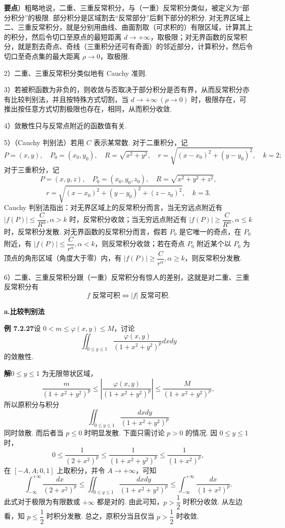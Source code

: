 \documentclass[UTF8,12pt,a4paper,fontset=fandol]{ctexart}
\begin{document}
\noindent\textbf{要点}）粗略地说，二重、三重反常积分，与（一重）反常积分类似，被定义为“部分积分”的极限. 部分积分是区域割去“反常部分”后剩下部分的积分. 对无界区域上二、三重反常积分，就是分别用曲线、曲面割取（可求积的）有限区域，计算其上的积分，然后令切口至原点的最短距离 $d\to+\infty$，取极限；对无界函数的反常积分，就是割去奇点、奇线（三重积分还可有奇面）的邻近部分，计算积分，然后令切口至奇点集的最大距离 $\rho\to0$，取极限.

2）二重、三重反常积分类似地有 Cauchy 准则.

3）若被积函数为非负的，则收敛与否取决于部分积分是否有界，从而反常积分亦有比较判别法，并且按特殊方式切割，当 $d\to+\infty\ (\rho\to0)$ 时，极限存在，可推出按任意方式切割极限也存在，相同，从而积分收敛.

4）敛散性只与反常点附近的函数值有关.

5）（Cauchy 判别法）若用 $C$ 表示某常数. 对于二重积分，记
\[
P=(x,y),\quad P_0=(x_0,y_0),\quad R=\sqrt{x^2+y^2},\quad
r=\sqrt{(x-x_0)^2+(y-y_0)^2},\quad k=2;
\]
对于三重积分，记
\[
P=(x,y,z),\quad P_0=(x_0,y_0,z_0),\quad R=\sqrt{x^2+y^2+z^2},
\]
\[
r=\sqrt{(x-x_0)^2+(y-y_0)^2+(z-z_0)^2},\quad k=3.
\]
Cauchy 判别法指出：对无界区域上的反常积分而言，当无穷远点附近有 $|f(P)|\le\dfrac C{R^\alpha},\alpha>k$ 时，反常积分收敛；当无穷远点附近有 $|f(P)|\ge\dfrac C{R^\alpha},\alpha\le k$ 时，反常积分发散. 对无界函数的反常积分而言，假若 $P_0$ 是它唯一的奇点，在 $P_0$ 附近，有 $|f(P)|\le\dfrac C{r^\alpha},\alpha<k$，则反常积分收敛；若在奇点 $P_0$ 附近某个以 $P_0$ 为顶点的角形区域（角度大于零）内，有 $|f(P)|\ge\dfrac C{r^\alpha},\alpha\ge k$，则反常积分发散.

6）二重、三重反常积分跟（一重）反常积分有惊人的差别，这就是对二重、三重反常积分有
\[
f\text{ 反常可积}\Longleftrightarrow |f|\text{ 反常可积}.
\]

\noindent\textbf{a.\quad 比较判别法}

\noindent\textbf{例 7.2.27}\quad 设 $0<m\le\varphi(x,y)\le M$，讨论
\[
\iint_{0\le y\le1}\frac{\varphi(x,y)}{(1+x^2+y^2)^p}dxdy
\]
的敛散性.

\noindent\textbf{解}\quad $0\le y\le1$ 为无限带状区域，
\[
\frac m{(1+x^2+y^2)^p}\le
\left|\frac{\varphi(x,y)}{(1+x^2+y^2)^p}\right|
\le\frac M{(1+x^2+y^2)^p},
\]
所以原积分与积分
\[
\iint_{0\le y\le1}\frac{dxdy}{(1+x^2+y^2)^p}
\]
同时敛散. 而后者当 $p\le0$ 时明显发散. 下面只需讨论 $p>0$ 的情况. 因 $0\le y\le1$ 时，
\[
0\le\frac1{(2+x^2)^p}\le\frac1{(1+x^2+y^2)^p}\le\frac1{(1+x^2)^p},
\]
在 $[-A,A;0,1]$ 上取积分，并令 $A\to+\infty$，可知
\[
\int_{-\infty}^{+\infty}\frac{dx}{(2+x^2)^p}
\le\iint_{0\le y\le1}\frac{dxdy}{(1+x^2+y^2)^p}
\le\int_{-\infty}^{+\infty}\frac{dx}{(1+x^2)^p}.
\]
此式对于极限为有限数或 $+\infty$ 都是对的. 由此可知，$p>\dfrac12$ 时积分收敛. 从左边看，知 $p\le\dfrac12$ 时积分发散. 总之，原积分当且仅当 $p>\dfrac12$ 时收敛.
\end{document}
